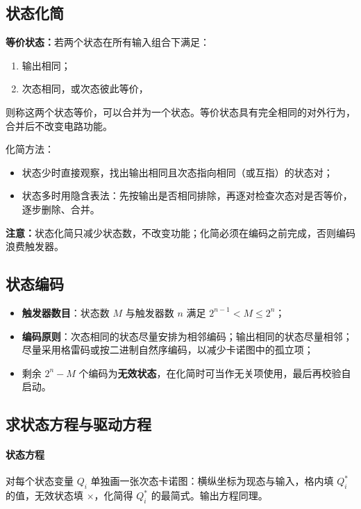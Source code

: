 \subsection{状态化简}
\textbf{等价状态：}若两个状态在所有输入组合下满足：
\begin{enumerate}
    \item 输出相同；
    \item 次态相同，或次态彼此等价，
\end{enumerate}
则称这两个状态等价，可以合并为一个状态。等价状态具有完全相同的对外行为，合并后不改变电路功能。

\noindent 化简方法：
\begin{itemize}
    \item 状态少时直接观察，找出输出相同且次态指向相同（或互指）的状态对；
    \item 状态多时用隐含表法：先按输出是否相同排除，再逐对检查次态对是否等价，逐步删除、合并。
\end{itemize}

\noindent\textbf{注意：}状态化简只减少状态数，不改变功能；化简必须在编码之前完成，否则编码浪费触发器。

\subsection{状态编码}
\begin{itemize}
    \item \textbf{触发器数目}：状态数 $M$ 与触发器数 $n$ 满足 $2^{n-1}<M\leq 2^n$；
    \item \textbf{编码原则}：次态相同的状态尽量安排为相邻编码；输出相同的状态尽量相邻；
    尽量采用格雷码或按二进制自然序编码，以减少卡诺图中的孤立项；
    \item 剩余 $2^n-M$ 个编码为\textbf{无效状态}，在化简时可当作无关项使用，最后再校验自启动。
\end{itemize}

\subsection{求状态方程与驱动方程}
\paragraph{状态方程}对每个状态变量 $Q_i$ 单独画一张次态卡诺图：横纵坐标为现态与输入，格内填 $Q_i^*$ 的值，无效状态填 $\times$，化简得 $Q_i^*$ 的最简式。输出方程同理。

